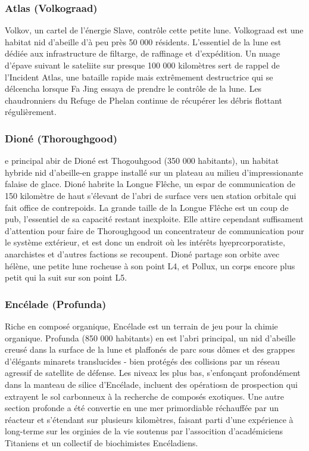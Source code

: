 \subsubsection{Atlas (Volkograad)} \label{sec:atlas-volkograad} 

Volkov, un cartel de l'énergie Slave, contrôle cette petite lune. Volkograad est une habitat nid d'abeille d'à peu près 50 000 résidents. L'essentiel de la lune est dédiée aux infrastructure de filtarge, de raffinage et d'expédition. Un nuage d'épave suivant le sateliite sur presque 100 000 kilomètres sert de rappel de l'Incident Atlas, une bataille rapide mais extrêmement destructrice qui se délcencha lorsque Fa Jing essaya de prendre le contrôle de la lune. Les chaudronniers du Refuge de Phelan continue de récupérer les débris flottant régulièrement. 

\subsubsection{Dioné (Thoroughgood)} \label{sec:dione-thoroughgood} 

e principal abir de Dioné est Thogouhgood (350 000 habitants), un habitat hybride nid d'abeille-en grappe installé sur un plateau au milieu d'impressionante falaise de glace. Dioné habrite la Longue Flêche, un espar de communication de 150 kilomètre de haut s'élevant de l'abri de surface vers uen station orbitale qui fait office de contrepoids. La grande taille de la Longue Flêche est un coup de pub, l'essentiel de sa capacité restant inexploite. Elle attire cependant suffisament d'attention pour faire de Thoroughgood un concentrateur de communication pour le système extérieur, et est donc un endroit où les intérêts hyeprcorporatiste, anarchistes et d'autres factions se recoupent. Dioné partage son orbite avec hélène, une petite  lune rocheuse à son point L4, et Pollux, un corps encore plus petit qui la suit sur son point L5. 

\subsubsection{Encélade (Profunda)} \label{sec:enceladus-profunda} 

Riche en composé organique, Encélade est un terrain de jeu pour la chimie organique. Profunda (850 000 habitants) en est l'abri principal, un nid d'abeille creusé dans la surface de la lune et plaffonés de parc sous dômes et des grappes d'élégants minarets translucides - bien protégés des collisions par un réseau agressif de satellite de défense. Les niveax les plus bas, s'enfonçant profondément dans la manteau de silice d'Encélade, incluent des opératiosn de prospection qui extrayent le sol carbonneux à la recherche de composés exotiques. Une autre section profonde a été convertie en une mer primordiable réchauffée par un réacteur et s'étendant sur plusieurs kilomètres, faisant parti d'une expérience à long-terme sur les orginies de la vie soutenus par l'assocition d'académiciens Titaniens et un collectif de biochimistes Encéladiens. 

